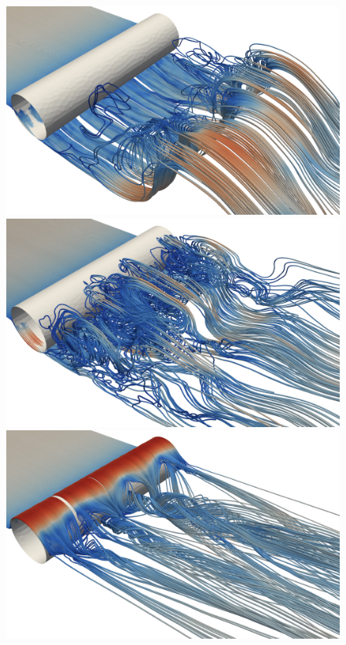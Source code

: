 \begin{figure}
  \centering
 \includegraphics[width=\twofigs]{chapters/hoffman-1/png/Hoffman_fig5a.png}
  \includegraphics[width=\twofigs]{chapters/hoffman-1/png/Hoffman_fig5b.png} \\
  \includegraphics[width=\twofigs]{chapters/hoffman-1/png/Hoffman_fig5c.png}

\end{figure}
